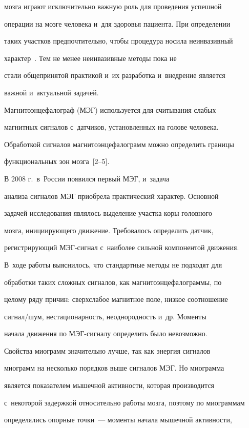 мозга играют исключительно важную роль для проведения успешной

операции на мозге человека и~для здоровья пациента. При определении

таких участков предпочтительно, чтобы процедура носила неинвазивный

характер~\cite{baillet}. Тем не менее неинвазивные методы пока не

стали общепринятой практикой и~их разработка и~внедрение является

важной и~актуальной задачей.



Магнитоэнцефалограф (МЭГ) используется для считывания слабых

магнитных сигналов с~датчиков, установленных на голове человека.

Обработкой сигналов магнитоэнцефалограмм можно определить границы

функциональных зон мозга~[2--5].



В 2008 г.\ в~России появился первый МЭГ, и~задача

анализа сигналов МЭГ приобрела практический характер. Основной

задачей исследования являлось выделение участка коры головного

мозга, инициирующего движение. Требовалось определить датчик,

регистрирующий МЭГ-сиг\-нал с~наиболее сильной компонентой движения. 

В~ходе работы выяснилось, что стандартные методы не подходят для

обработки таких сложных сигналов, как магнитоэнцефалограммы, по

целому ряду причин: сверхслабое магнитное поле, низкое соотношение

сигнал/шум, нестационарность, неоднородность и~др. Моменты

начала движения по МЭГ-сиг\-на\-лу определить было невозможно.



Свойства миограмм значительно лучше, так как энергия сигналов

миограмм на несколько порядков выше сигналов МЭГ. Но миограмма

является показателем мышечной активности, которая производится 

с~некоторой задержкой относительно работы мозга, поэтому по миограммам

определялись опорные точки~--- моменты начала  мышечной активности,

